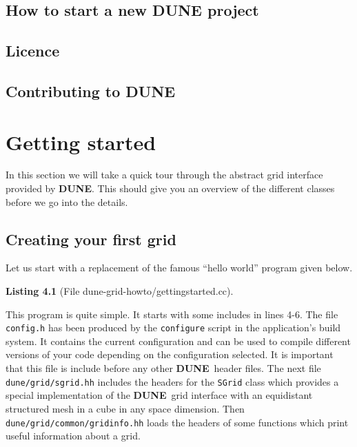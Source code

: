 \documentclass[11pt,a4paper,headinclude,footinclude,DIV14,BCOR8.25mm,titlepage,twoside,openright,normalheadings]{scrreprt}
\newcommand{\Dune}{{\sf\bfseries DUNE}}
\newtheorem{lst}{Listing}
\begin{document}
\section{How to start a new DUNE project}

\section{Licence}

\section{Contributing to DUNE}



\chapter{Getting started}

In this section we will take a quick tour through the abstract
grid interface provided by \Dune. This should give you an overview of
the different classes before we go into the details.

\section{Creating your first grid}

Let us start with a replacement of the famous ``hello world''
program given below.

\begin{lst}[File dune-grid-howto/gettingstarted.cc] \mbox{}


\end{lst}

This program is quite simple. It starts with some includes in lines
4-6. The file \lstinline!config.h! has been produced by the
\lstinline!configure! script in the application's build system. It contains the
current configuration and can be used to compile different versions of
your code depending on the configuration selected. It is important
that this file is include before any other \Dune\ header files. The
next file \lstinline!dune/grid/sgrid.hh! includes the headers for the
\lstinline!SGrid! class which provides a special implementation of the
\Dune\ grid interface with an equidistant structured mesh in a cube in
any space dimension. Then \lstinline!dune/grid/common/gridinfo.hh!
loads the headers of some functions which print useful information
about a grid.
\end{document}
